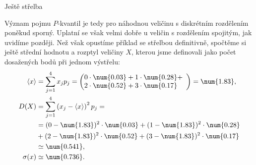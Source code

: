 \begin{luaexambox}{Ještě střelba}
\begin{example}
    Význam pojmu \(P\)-kvantil je tedy pro náhodnou veličinu s diskrétním rozdělením poněkud sporný.
    Uplatní se však velmi dobře u veličin s rozdělením spojitým, jak uvidíme později. Než však
    opustíme příklad se střelbou definitivně, spočtěme si ještě střední hodnotu a rozptyl veličiny
    \(X\), kterou jsme definovali jako počet dosažených bodů při jednom výstřelu:
    \begin{align*}
      \langle x \rangle 
          &=  \sum_{j=1}^{4}x_jp_j =                                                              
              \left(
                \begin{array}{@{}l}
                  0\cdot\num{0.03} + 1\cdot\num{0.28} + \\
                  2\cdot\num{0.52} + 3\cdot\num{0.17}
                \end{array}
              \right) = \num{1.83},                                                              \\
      D(X)  &= \sum_{j=1}^{4}\left(x_j - \langle x \rangle \right)^2p_j =                        \\
            &= (0-\num{1.83})^2\cdot\num{0.03}+(1-\num{1.83})^2\cdot\num{0.28}                   \\
            &+ (2-\num{1.83})^2\cdot\num{0.52}+(3-\num{1.83})^2\cdot\num{0.17}                   \\
                &\simeq\num{0.541},                                                              \\
      \sigma(x) &\simeq\num{0.736}.
    \end{align*}


\end{example}
\end{luaexambox}
